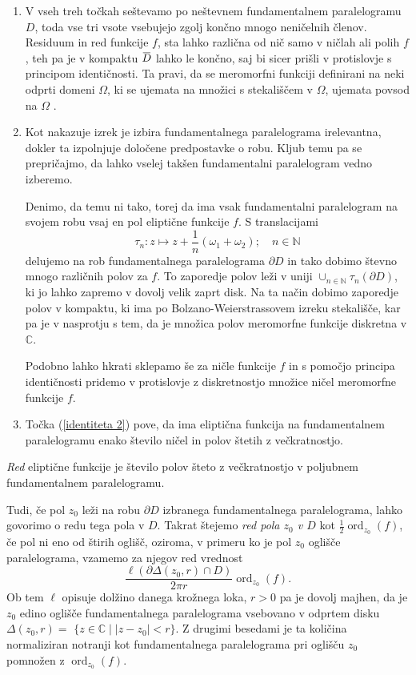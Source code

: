 \documentclass[mat1]{fmfdelo}
\newcommand{\N}{\mathbb N}
\newcommand{\C}{\mathbb C}
\newcommand{\om}{\omega}
\newcommand{\ord}[2]{\operatorname{ord}_{#1}(#2)}
\newcommand{\ols}[1]{\mskip.5\thinmuskip\overline{\mskip-.5\thinmuskip {#1} \mskip-.5\thinmuskip}\mskip.5\thinmuskip} %
\theoremstyle{definition}
\begin{document}
\begin{opomba}
    \label{liouville opomba}
    \begin{enumerate}
        \item
        V vseh treh točkah seštevamo po neštevnem fundamentalnem paralelogramu $D$, toda vse tri vsote vsebujejo zgolj končno mnogo neničelnih členov. Residuum in red funkcije $f$, sta lahko različna od nič samo v ničlah ali polih $f$, teh pa je v kompaktu $\ols{D}$ lahko le končno, saj bi sicer prišli v protislovje s principom identičnosti. Ta pravi, da se meromorfni funkciji definirani na neki odprti domeni $\Omega$, ki se ujemata na množici s stekališčem v $\Omega$, ujemata povsod na $\Omega$ \cite[]{}.
        \item 
        Kot nakazuje izrek je izbira fundamentalnega paralelograma irelevantna, dokler ta izpolnjuje določene predpostavke o robu. Kljub temu pa se prepričajmo, da lahko vselej takšen fundamentalni paralelogram vedno izberemo. 

        Denimo, da temu ni tako, torej da ima vsak fundamentalni paralelogram na svojem robu vsaj en pol eliptične funkcije $f$. S translacijami
        \[
            \tau_n : z \mapsto z + \frac{1}{n}(\om_1 + \om_2); \quad n\in \N
        \]
        delujemo na rob fundamentalnega paralelograma $\partial D$ in tako dobimo števno mnogo različnih polov za $f$. To zaporedje polov leži v uniji $\cup_{n \in \N} \tau_n(\partial D)$, ki jo lahko zapremo v dovolj velik zaprt disk. Na ta način dobimo zaporedje polov v kompaktu, ki ima po Bolzano-Weierstrassovem izreku stekališče, kar pa je v nasprotju s tem, da je množica polov meromorfne funkcije diskretna v $\C$. 
        
        Podobno lahko hkrati sklepamo še za ničle funkcije $f$ in s pomočjo principa identičnosti pridemo v protislovje z diskretnostjo množice ničel meromorfne funkcije $f$.
        \item 
        Točka (\ref{identiteta 2}) pove, da ima eliptična funkcija na fundamentalnem paralelogramu enako število ničel in polov štetih z večkratnostjo. 
    \end{enumerate}
\end{opomba}

\begin{definicija}
    \emph{Red} eliptične funkcije je število polov šteto z večkratnostjo v poljubnem fundamentalnem paralelogramu. 
\end{definicija}

Tudi, če pol $z_0$ leži na robu $\partial D$ izbranega fundamentalnega paralelograma, lahko govorimo o redu tega pola v $D$. Takrat štejemo \emph{red pola $z_0$ v $D$} kot $\frac{1}{2}\ord{z_0}{f}$, če pol ni eno od štirih oglišč, oziroma, v primeru ko je pol $z_0$ oglišče paralelograma, vzamemo za njegov red vrednost
\[
    \frac{\ell(\partial \Delta(z_0, r) \cap D)}{2 \pi r}\ord{z_0}{f}.
\]
Ob tem $\ell$ opisuje dolžino danega krožnega loka, $r > 0$ pa je dovolj majhen, da je $z_0$ edino oglišče fundamentalnega paralelograma vsebovano v odprtem disku ${\Delta(z_0, r) =}$ ${\{z \in \C \mid \left\lvert z - z_0 \right\rvert < r\}}$. Z drugimi besedami je ta količina normaliziran notranji kot fundamentalnega paralelograma pri oglišču $z_0$ pomnožen z $\ord{z_0}{f}$.  
\end{document}
